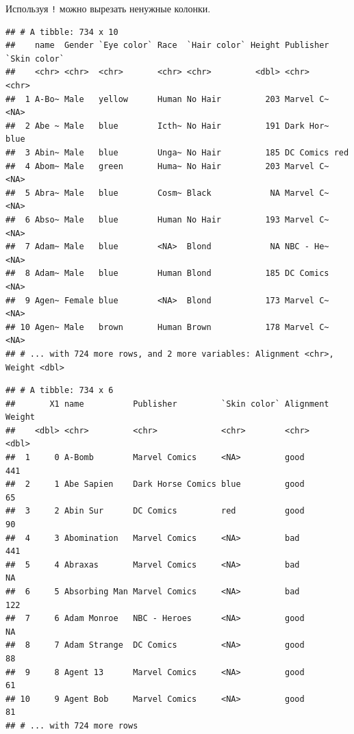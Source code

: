 \documentclass[
]{book}
\newenvironment{Shaded}{\begin{snugshade}}{\end{snugshade}}
\newcommand{\KeywordTok}[1]{\textcolor[rgb]{0.13,0.29,0.53}{\textbf{#1}}}
\newcommand{\NormalTok}[1]{#1}
\newcommand{\OperatorTok}[1]{\textcolor[rgb]{0.81,0.36,0.00}{\textbf{#1}}}
\newcommand{\StringTok}[1]{\textcolor[rgb]{0.31,0.60,0.02}{#1}}
\begin{document}
Используя \texttt{!} можно вырезать ненужные колонки.

\begin{Shaded}
\end{Shaded}

\begin{verbatim}
## # A tibble: 734 x 10
##    name  Gender `Eye color` Race  `Hair color` Height Publisher `Skin color`
##    <chr> <chr>  <chr>       <chr> <chr>         <dbl> <chr>     <chr>       
##  1 A-Bo~ Male   yellow      Human No Hair         203 Marvel C~ <NA>        
##  2 Abe ~ Male   blue        Icth~ No Hair         191 Dark Hor~ blue        
##  3 Abin~ Male   blue        Unga~ No Hair         185 DC Comics red         
##  4 Abom~ Male   green       Huma~ No Hair         203 Marvel C~ <NA>        
##  5 Abra~ Male   blue        Cosm~ Black            NA Marvel C~ <NA>        
##  6 Abso~ Male   blue        Human No Hair         193 Marvel C~ <NA>        
##  7 Adam~ Male   blue        <NA>  Blond            NA NBC - He~ <NA>        
##  8 Adam~ Male   blue        Human Blond           185 DC Comics <NA>        
##  9 Agen~ Female blue        <NA>  Blond           173 Marvel C~ <NA>        
## 10 Agen~ Male   brown       Human Brown           178 Marvel C~ <NA>        
## # ... with 724 more rows, and 2 more variables: Alignment <chr>, Weight <dbl>
\end{verbatim}

\begin{Shaded}
\end{Shaded}

\begin{verbatim}
## # A tibble: 734 x 6
##       X1 name          Publisher         `Skin color` Alignment Weight
##    <dbl> <chr>         <chr>             <chr>        <chr>      <dbl>
##  1     0 A-Bomb        Marvel Comics     <NA>         good         441
##  2     1 Abe Sapien    Dark Horse Comics blue         good          65
##  3     2 Abin Sur      DC Comics         red          good          90
##  4     3 Abomination   Marvel Comics     <NA>         bad          441
##  5     4 Abraxas       Marvel Comics     <NA>         bad           NA
##  6     5 Absorbing Man Marvel Comics     <NA>         bad          122
##  7     6 Adam Monroe   NBC - Heroes      <NA>         good          NA
##  8     7 Adam Strange  DC Comics         <NA>         good          88
##  9     8 Agent 13      Marvel Comics     <NA>         good          61
## 10     9 Agent Bob     Marvel Comics     <NA>         good          81
## # ... with 724 more rows
\end{verbatim}
\end{document}
